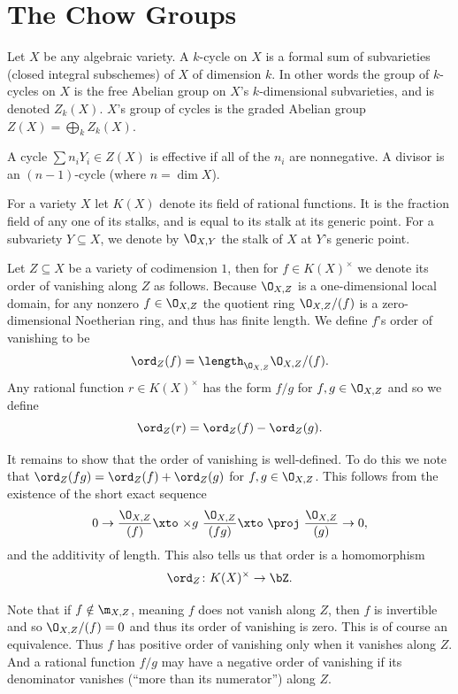 \section{The Chow Groups}

\bdefn

    Let $X$ be any algebraic variety.
    A {\emphcolor $k$-cycle} on $X$ is a formal sum of subvarieties (closed integral subschemes) of $X$
    of dimension $k$.
    In other words the group of $k$-cycles on $X$ is the free Abelian group on $X$'s $k$-dimensional
    subvarieties, and is denoted $Z_k(X)$.
    $X$'s {\emphcolor group of cycles} is the graded Abelian group $Z(X)=\bigoplus_kZ_k(X)$.

    A cycle $\sum n_iY_i\in Z(X)$ is {\emphcolor effective} if all of the $n_i$ are nonnegative.
    A {\emphcolor divisor} is an $(n-1)$-cycle (where $n=\dim X$).

\edefn

For a variety $X$ let $K(X)$ denote its field of rational functions.
It is the fraction field of any one of its stalks, and is equal to its stalk at its generic point.
For a subvariety $Y\subseteq X$, we denote by $\O_{X,Y}$ the stalk of $X$ at $Y$'s generic point.

\bdefn

    Let $Z\subseteq X$ be a variety of codimension $1$, then for $f\in K(X)^\times$ we denote its
    {\emphcolor order of vanishing} along $Z$ as follows.
    Because $\O_{X,Z}$ is a one-dimensional local domain, for any nonzero $f\in\O_{X,Z}$ the quotient ring
    $\O_{X,Z}/(f)$ is a zero-dimensional Noetherian ring, and thus has finite length.
    We define $f$'s order of vanishing to be
    $$ \ord_Z(f) = \length_{\O_{X,Z}}\O_{X,Z}/(f) . $$
    Any rational function $r\in K(X)^\times$ has the form $f/g$ for $f,g\in\O_{X,Z}$ and so we define
    $$ \ord_Z(r) = \ord_Z(f) - \ord_Z(g) . $$

\edefn

It remains to show that the order of vanishing is well-defined.
To do this we note that $\ord_Z(fg)=\ord_Z(f)+\ord_Z(g)$ for $f,g\in\O_{X,Z}$.
This follows from the existence of the short exact sequence
$$ 0 \to \frac{\O_{X,Z}}{(f)} \xtos{\times g} \frac{\O_{X,Z}}{(fg)} \xtos{\proj} \frac{\O_{X,Z}}{(g)} \to 0 , $$
and the additivity of length.
This also tells us that order is a homomorphism
$$ \ord_Z\colon K(X)^\times \to \bZ . $$

Note that if $f\notin\m_{X,Z}$, meaning $f$ does not vanish along $Z$, then $f$ is invertible and so
$\O_{X,Z}/(f)=0$ and thus its order of vanishing is zero.
This is of course an equivalence.
Thus $f$ has positive order of vanishing only when it vanishes along $Z$.
And a rational function $f/g$ may have a negative order of vanishing if its denominator vanishes (``more than
its numerator'') along $Z$.

